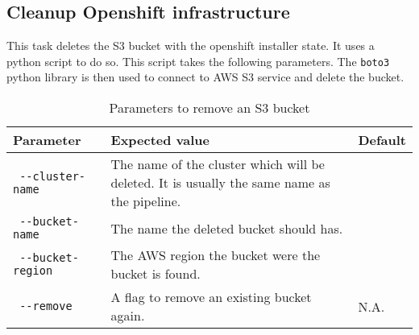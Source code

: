 \subsection{Cleanup Openshift infrastructure}\label{subsec:cleanup-openshift-infrastructure}

This task deletes the S3 bucket with the openshift installer state.
It uses a python script to do so.
This script takes the following parameters.
The \verb|boto3| python library is then used to connect to AWS S3 service and delete the bucket.

\begin{table}
    \centering
    \caption{Parameters to remove an S3 bucket}
    \label{tab:params-remove-s3-bucket}
    \begin{tabular}{| p | p | p |}
        Parameter & Expected value & Default \\
        \hline
        \verb| --cluster-name | & The name of the cluster which will be deleted. It is usually the same name as the pipeline. &  \\
        \verb| --bucket-name | & The name the deleted bucket should has. &  \\
        \verb| --bucket-region | & The AWS region the bucket were the bucket is found. &  \\
        \verb| --remove | & A flag to remove an existing bucket again. &  N.A. \\
    \end{tabular}
\end{table}

